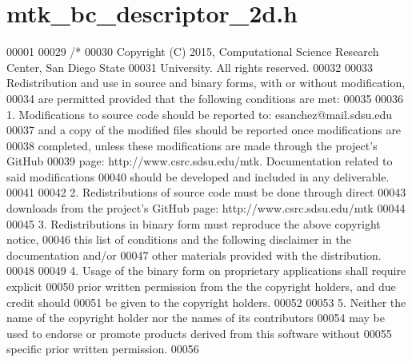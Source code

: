 \hypertarget{mtk__bc__descriptor__2d_8h_source}{\section{mtk\+\_\+bc\+\_\+descriptor\+\_\+2d.\+h}
\label{mtk__bc__descriptor__2d_8h_source}
}

\begin{DoxyCode}
00001 
00029 \textcolor{comment}{/*}
00030 \textcolor{comment}{Copyright (C) 2015, Computational Science Research Center, San Diego State}
00031 \textcolor{comment}{University. All rights reserved.}
00032 \textcolor{comment}{}
00033 \textcolor{comment}{Redistribution and use in source and binary forms, with or without modification,}
00034 \textcolor{comment}{are permitted provided that the following conditions are met:}
00035 \textcolor{comment}{}
00036 \textcolor{comment}{1. Modifications to source code should be reported to: esanchez@mail.sdsu.edu}
00037 \textcolor{comment}{and a copy of the modified files should be reported once modifications are}
00038 \textcolor{comment}{completed, unless these modifications are made through the project's GitHub}
00039 \textcolor{comment}{page: http://www.csrc.sdsu.edu/mtk. Documentation related to said modifications}
00040 \textcolor{comment}{should be developed and included in any deliverable.}
00041 \textcolor{comment}{}
00042 \textcolor{comment}{2. Redistributions of source code must be done through direct}
00043 \textcolor{comment}{downloads from the project's GitHub page: http://www.csrc.sdsu.edu/mtk}
00044 \textcolor{comment}{}
00045 \textcolor{comment}{3. Redistributions in binary form must reproduce the above copyright notice,}
00046 \textcolor{comment}{this list of conditions and the following disclaimer in the documentation and/or}
00047 \textcolor{comment}{other materials provided with the distribution.}
00048 \textcolor{comment}{}
00049 \textcolor{comment}{4. Usage of the binary form on proprietary applications shall require explicit}
00050 \textcolor{comment}{prior written permission from the the copyright holders, and due credit should}
00051 \textcolor{comment}{be given to the copyright holders.}
00052 \textcolor{comment}{}
00053 \textcolor{comment}{5. Neither the name of the copyright holder nor the names of its contributors}
00054 \textcolor{comment}{may be used to endorse or promote products derived from this software without}
00055 \textcolor{comment}{specific prior written permission.}
00056 \textcolor{comment}{}

\end{DoxyCode}
